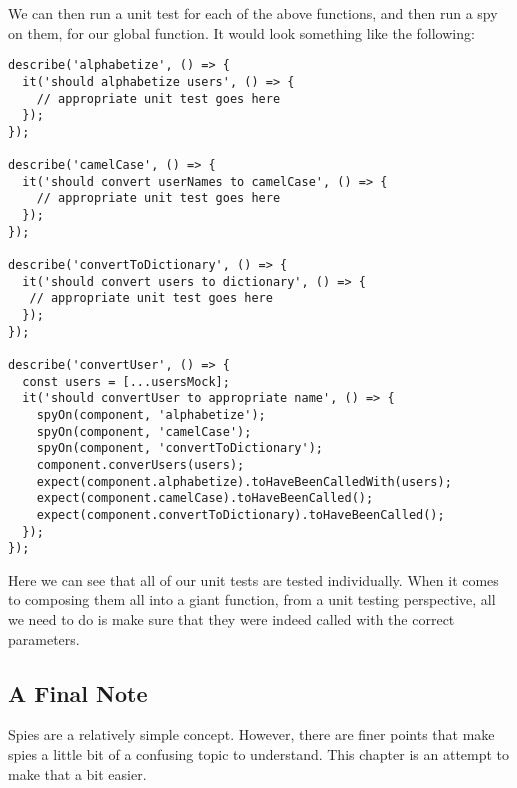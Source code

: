 
We can then run a unit test for each of the above functions, and then run a spy
on them, for our global function. It would look something like the following:

\begin{lstlisting}
describe('alphabetize', () => {
  it('should alphabetize users', () => {
    // appropriate unit test goes here
  });
});

describe('camelCase', () => {
  it('should convert userNames to camelCase', () => {
    // appropriate unit test goes here
  });
});

describe('convertToDictionary', () => {
  it('should convert users to dictionary', () => {
   // appropriate unit test goes here
  });
});

describe('convertUser', () => {
  const users = [...usersMock];
  it('should convertUser to appropriate name', () => {
    spyOn(component, 'alphabetize');
    spyOn(component, 'camelCase');
    spyOn(component, 'convertToDictionary');
    component.converUsers(users);
    expect(component.alphabetize).toHaveBeenCalledWith(users);
    expect(component.camelCase).toHaveBeenCalled();
    expect(component.convertToDictionary).toHaveBeenCalled();
  });
});
\end{lstlisting}

Here we can see that all of our unit tests are tested individually. When it
comes to composing them all into a giant function, from a unit testing
perspective, all we need to do is make sure that they were indeed called with
the correct parameters.

\subsection{ A Final Note }
Spies are a relatively simple concept. However, there are finer points that
make spies a little bit of a confusing topic to understand. This chapter is an
attempt to make that a bit easier. 
